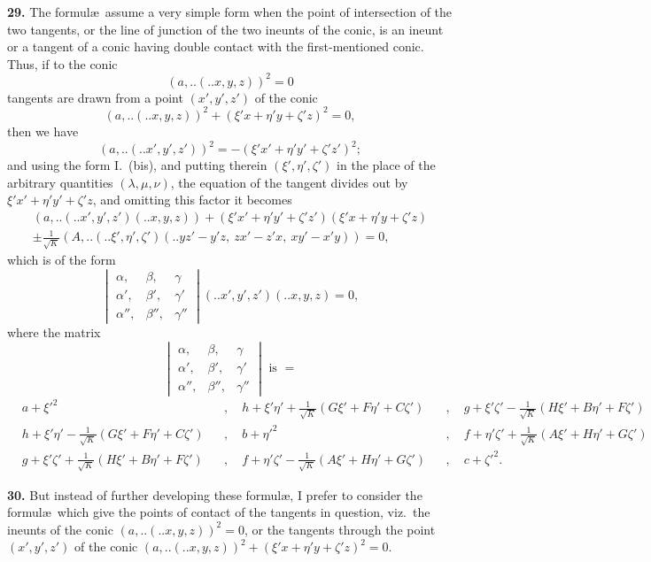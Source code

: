 \documentclass[12pt,a4paper]{article}
\newcommand{\qform}[2]{(#1 \mathbin{..} #2)}
\theoremstyle{definition}
\begin{document}
\textbf{29.} The formul\ae\ assume a very simple form when the point of intersection of the two tangents, or the line of junction of the two ineunts of the conic, is an ineunt or a tangent of a conic having double contact with the first-mentioned conic. Thus, if to the conic
\[
(a,..\!\qform{}{x, y, z})^{2} = 0
\]
tangents are drawn from a point $(x', y', z')$ of the conic
\[
(a,..\!\qform{}{x, y, z})^{2} + (\xi'x + \eta'y + \zeta'z)^{2} = 0,
\]
then we have
\[
(a,..\!\qform{}{x', y', z'})^{2} = -(\xi'x' + \eta'y' + \zeta'z')^{2};
\]
and using the form I.\ (bis), and putting therein $(\xi', \eta', \zeta')$ in the place of the arbitrary quantities $(\lambda, \mu, \nu)$, the equation of the tangent divides out by $\xi'x' + \eta'y' + \zeta'z$, and omitting this factor it becomes
\begin{multline*}
(a,..\!\qform{}{x', y', z'}\!\qform{}{x, y, z}) + (\xi'x' + \eta'y' + \zeta'z')(\xi'x + \eta'y + \zeta'z)\\
\pm \frac{1}{\sqrt{K}}(A,..\!\qform{}{\xi', \eta', \zeta'}\!\qform{}{yz' - y'z,\ zx' - z'x,\ xy' - x'y}) = 0,
\end{multline*}
which is of the form
\[
\begin{vmatrix}
\alpha, & \beta, & \gamma \\
\alpha', & \beta', & \gamma' \\
\alpha'', & \beta'', & \gamma''
\end{vmatrix}
\!\qform{}{x', y', z'}\!\qform{}{x, y, z} = 0,
\]
where the matrix
\[
\begin{vmatrix}
\alpha, & \beta, & \gamma \\
\alpha', & \beta', & \gamma' \\
\alpha'', & \beta'', & \gamma''
\end{vmatrix}
\text{ is } =
\]
\begin{align*}
&a + \xi'^{2} &&,\quad h + \xi'\eta' + \tfrac{1}{\sqrt{K}}(G\xi' + F\eta' + C\zeta') &&,\quad g + \xi'\zeta' - \tfrac{1}{\sqrt{K}}(H\xi' + B\eta' + F\zeta')\\
&h + \xi'\eta' - \tfrac{1}{\sqrt{K}}(G\xi' + F\eta' + C\zeta') &&,\quad b + \eta'^{2} &&,\quad f + \eta'\zeta' + \tfrac{1}{\sqrt{K}}(A\xi' + H\eta' + G\zeta')\\
&g + \xi'\zeta' + \tfrac{1}{\sqrt{K}}(H\xi' + B\eta' + F\zeta') &&,\quad f + \eta'\zeta' - \tfrac{1}{\sqrt{K}}(A\xi' + H\eta' + G\zeta') &&,\quad c + \zeta'^{2}.
\end{align*}

\textbf{30.} But instead of further developing these formul\ae, I prefer to consider the formul\ae\ which give the points of contact of the tangents in question, viz.\ the ineunts of the conic $(a,..\!\qform{}{x, y, z})^{2} = 0$, or the tangents through the point $(x', y', z')$ of the conic $(a,..\!\qform{}{x, y, z})^{2} + (\xi'x + \eta'y + \zeta'z)^{2} = 0$.
\end{document}

